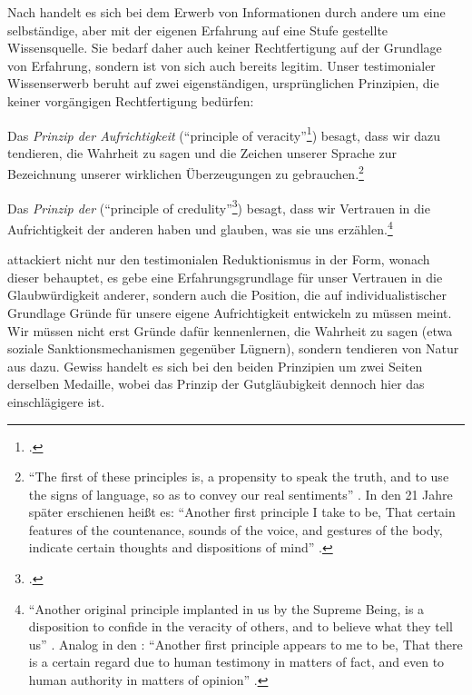 Nach  handelt es sich bei dem Erwerb von Informationen durch
andere um eine selbständige, aber mit der eigenen Erfahrung auf eine Stufe gestellte
Wissensquelle. Sie bedarf daher auch keiner Rechtfertigung auf der Grundlage von
Erfahrung, sondern ist von sich auch bereits legitim. Unser testimonialer
Wissenserwerb beruht auf zwei eigenständigen, ursprünglichen Prinzipien, die
keiner vorgängigen Rechtfertigung bedürfen:
\begin{nummerierung}
\item Das \emph{Prinzip der Aufrichtigkeit} (\enquote{principle of
veracity}\footnote{\cite[][194]{Reid:AnInquiryIntotheHumanMindonthePrinciplesofCommonSense1997}.})
besagt, dass wir dazu tendieren, die Wahrheit zu sagen und die Zeichen unserer
Sprache zur Bezeichnung unserer wirklichen Überzeugungen zu
gebrauchen.\footnote{\enquote{The first of these principles is, a propensity
to speak the truth, and to use the signs of language, so as to convey our real
sentiments}
\parencite[][193]{Reid:AnInquiryIntotheHumanMindonthePrinciplesofCommonSense1997}.
In den 21 Jahre später erschienen  heißt es: \enquote{Another first principle I take to be, That certain
features of the countenance, sounds of the voice, and gestures of the body,
indicate certain thoughts and dispositions of mind}
\parencite[][484]{Reid:EssaysontheIntellectualPowersofMan2002}.}
\item Das \emph{Prinzip der } (\enquote{principle of
credulity}\footcite[][194]{Reid:AnInquiryIntotheHumanMindonthePrinciplesofCommonSense1997})
besagt, dass wir Vertrauen in die Aufrichtigkeit der anderen haben und glauben,
was sie uns
erzählen.\footnote{\enquote{Another original principle implanted in us by the
Supreme Being, is a disposition to confide in the veracity of others, and to
believe what they tell us}
\parencite[][194]{Reid:AnInquiryIntotheHumanMindonthePrinciplesofCommonSense1997}.
Analog in den :
\enquote{Another first principle appears to me to be, That there is a certain
regard due to human testimony in matters of fact, and even to human authority
in matters of opinion}
\parencite[][487]{Reid:EssaysontheIntellectualPowersofMan2002}.}
\end{nummerierung}
 attackiert nicht nur den testimonialen Reduktionismus in der Form,
wonach dieser behauptet, es gebe eine Erfahrungsgrundlage für unser Vertrauen in
die Glaubwürdigkeit anderer, sondern auch die Position, die auf individualistischer Grundlage Gründe für unsere
eigene Aufrichtigkeit entwickeln zu müssen meint. Wir müssen nicht erst Gründe
dafür kennenlernen, die Wahrheit zu sagen (etwa soziale Sanktionsmechanismen
gegenüber Lügnern), sondern tendieren von Natur aus dazu. Gewiss handelt es sich
bei den beiden Prinzipien um zwei Seiten derselben Medaille, wobei das Prinzip
der Gutgläubigkeit dennoch hier das einschlägigere ist.


